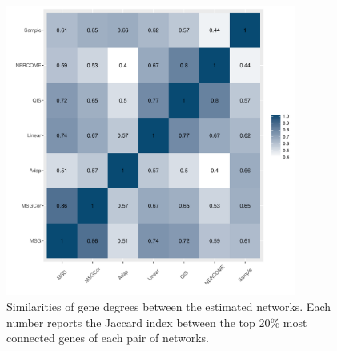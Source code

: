 \begin{figure}
  \centering
  \includegraphics[width=0.85\textwidth]{img/top20.pdf}
  \caption{Similarities of gene degrees between the estimated networks. Each number reports the Jaccard index between the top 20\% most connected genes of each pair of networks.}
  \label{top20}
\end{figure}

